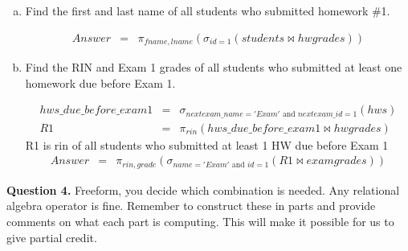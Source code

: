 \documentclass[11pt]{article}
\begin{document}
\begin{enumerate} [(a)]
\item Find the first and last name of all students who submitted
  homework \#1.

\begin{eqnarray*}
Answer & = & \pi_{fname, lname} (\sigma_{id=1 } (students \bowtie hwgrades) )
\end{eqnarray*}

\item Find the RIN and Exam 1 grades of all students who submitted at
  least one homework due before Exam 1.

\begin{eqnarray*}
hws\_due\_before\_exam1 & = & \sigma_{nextexam\_name = 'Exam' \mbox{ and } nextexam\_id=1} (hws) \\
R1 & = & \pi_{rin} (hws\_due\_before\_exam1 \bowtie hwgrades)
\end{eqnarray*}
R1 is rin of all students who submitted at least 1 HW due before Exam 1
\begin{eqnarray*}
Answer & = & \pi_{rin, grade} (\sigma_{ name = 'Exam' \mbox{ and } id=1} (R1 \bowtie examgrades))
\end{eqnarray*}

\end{enumerate}
\newpage

{\bf Question 4.} Freeform, you decide which combination is
needed. Any relational algebra operator is fine. Remember to construct
these in parts and provide comments on what each part is computing. This will make
it possible for us to give partial credit.
\end{document}

